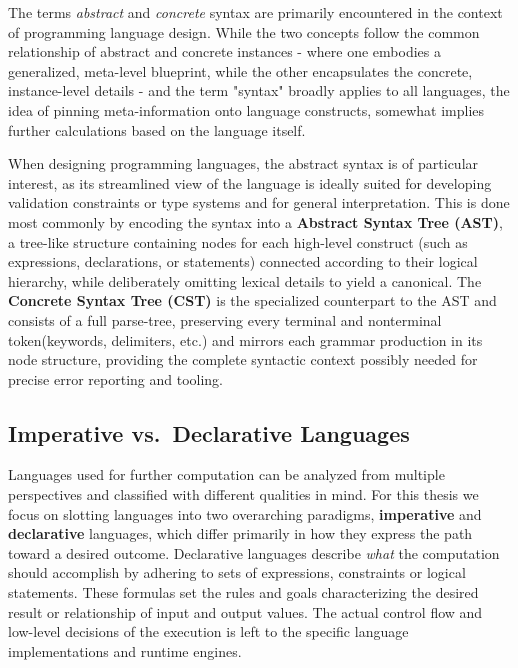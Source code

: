 The terms \textit{abstract} and \textit{concrete} syntax are primarily encountered in the context of programming language design. While the two concepts follow the common relationship of
abstract and concrete instances - where one embodies a generalized, meta-level blueprint, while the other encapsulates the concrete, instance-level details - and the term "syntax" broadly applies to all languages,
the idea of pinning meta-information onto language constructs, somewhat implies further calculations based on the language itself.

When designing programming languages, the abstract syntax is of particular interest, as its streamlined view of the language is ideally suited for developing
validation constraints or type systems and for general interpretation. This is done most commonly by encoding the syntax into a \textbf{Abstract Syntax Tree (AST)},
a tree-like structure containing nodes for each high-level construct (such as expressions, declarations, or statements) connected according to their logical hierarchy,
while deliberately omitting lexical details to yield a canonical. \cite{slonneger1995specifying}
The \textbf{Concrete Syntax Tree (CST)} is the specialized counterpart to the AST and consists of a full parse-tree, preserving every terminal and nonterminal
token(keywords, delimiters, etc.) and mirrors each grammar production in its node structure, providing the complete syntactic context possibly needed for precise error
reporting and tooling. \cite{aho2006compilers}

\label{sec:prog-paradigms}
\subsection{Imperative vs.\ Declarative Languages}

Languages used for further computation can be analyzed from multiple perspectives and classified with different qualities in mind. \cite{progParadigmsForDummiess}
For this thesis we focus on slotting languages into two overarching paradigms, \textbf{imperative} and \textbf{declarative} languages,
which differ primarily in how they express the path toward a desired outcome.
Declarative languages describe \textit{what} the computation should accomplish by adhering to sets of expressions, constraints or logical statements. \cite{grammarDrivenDSLDebug}
These formulas set the rules and goals characterizing the desired result or relationship of input and output values. The actual control flow and low-level decisions of
the execution is left to the specific language implementations and runtime engines.

